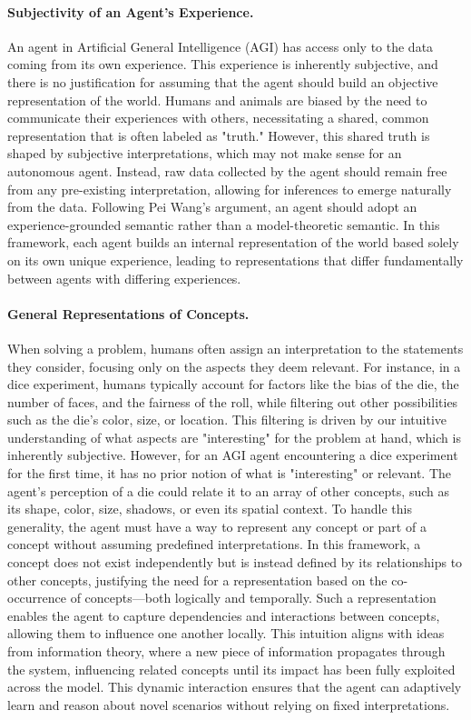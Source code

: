 \documentclass{article}
\begin{document}
\paragraph{Subjectivity of an Agent's Experience.}
An agent in Artificial General Intelligence (AGI) has access only to the data coming from its own experience. This experience is inherently subjective, and there is no justification for assuming that the agent should build an objective representation of the world. Humans and animals are biased by the need to communicate their experiences with others, necessitating a shared, common representation that is often labeled as "truth." However, this shared truth is shaped by subjective interpretations, which may not make sense for an autonomous agent. Instead, raw data collected by the agent should remain free from any pre-existing interpretation, allowing for inferences to emerge naturally from the data. Following Pei Wang's argument, an agent should adopt an experience-grounded semantic rather than a model-theoretic semantic. In this framework, each agent builds an internal representation of the world based solely on its own unique experience, leading to representations that differ fundamentally between agents with differing experiences.

\paragraph{General Representations of Concepts.}
When solving a problem, humans often assign an interpretation to the statements they consider, focusing only on the aspects they deem relevant. For instance, in a dice experiment, humans typically account for factors like the bias of the die, the number of faces, and the fairness of the roll, while filtering out other possibilities such as the die's color, size, or location. This filtering is driven by our intuitive understanding of what aspects are "interesting" for the problem at hand, which is inherently subjective. However, for an AGI agent encountering a dice experiment for the first time, it has no prior notion of what is "interesting" or relevant. The agent's perception of a die could relate it to an array of other concepts, such as its shape, color, size, shadows, or even its spatial context. To handle this generality, the agent must have a way to represent any concept or part of a concept without assuming predefined interpretations. In this framework, a concept does not exist independently but is instead defined by its relationships to other concepts, justifying the need for a representation based on the co-occurrence of concepts—both logically and temporally. Such a representation enables the agent to capture dependencies and interactions between concepts, allowing them to influence one another locally. This intuition aligns with ideas from information theory, where a new piece of information propagates through the system, influencing related concepts until its impact has been fully exploited across the model. This dynamic interaction ensures that the agent can adaptively learn and reason about novel scenarios without relying on fixed interpretations.
\end{document}
